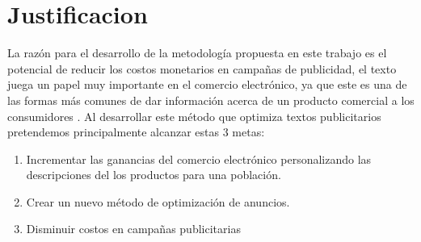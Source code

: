 \clearpage
\section{Justificacion}

La razón para el desarrollo de la metodología propuesta en este trabajo es el potencial de reducir los costos monetarios en campañas de publicidad, el texto juega un papel muy importante en el comercio electrónico, ya que este es una de las formas más comunes de dar información acerca de un producto comercial a los consumidores \cite{mcquarrie1999visual}. Al desarrollar este método que optimiza textos publicitarios pretendemos principalmente alcanzar estas 3 metas:

\begin{enumerate}
\item Incrementar las ganancias del comercio electrónico personalizando las descripciones del  los productos para una población. 
\item Crear un nuevo método de optimización de anuncios.
\item Disminuir costos en campañas publicitarias
\end{enumerate}